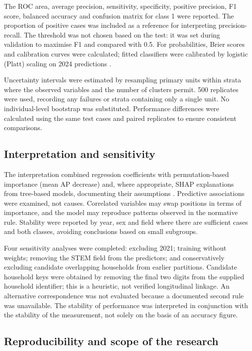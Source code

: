 The ROC area, average precision, sensitivity, specificity, positive precision, F1 score, balanced accuracy and confusion matrix for class 1 were reported. The proportion of positive cases was included as a reference for interpreting precision-recall. The threshold was not chosen based on the test: it was set during validation to maximise F1 and compared with 0.5. For probabilities, Brier scores and calibration curves were calculated; fitted classifiers were calibrated by logistic (Platt) scaling on 2024 predictions \cite{SilvaFilho2023}.

Uncertainty intervals were estimated by resampling primary units within strata where the observed variables and the number of clusters permit. 500 replicates were used, recording any failures or strata containing only a single unit. No individual-level bootstrap was substituted. Performance differences were calculated using the same test cases and paired replicates to ensure consistent comparisons.

\subsection{Interpretation and sensitivity}




The interpretation combined regression coefficients with permutation-based importance (mean AP decrease) and, where appropriate, SHAP explanations from tree-based models, documenting their assumptions \cite{Molnar2025}. Predictive associations were examined, not causes. Correlated variables may swap positions in terms of importance, and the model may reproduce patterns observed in the normative rule. Stability were reported by year, sex and field where there are sufficient cases and both classes, avoiding conclusions based on small subgroups.

Four sensitivity analyses were completed: excluding 2021; training without weights; removing the STEM field from the predictors; and conservatively excluding candidate overlapping households from earlier partitions. Candidate household keys were obtained by removing the final two digits from the supplied household identifier; this is a heuristic, not verified longitudinal linkage. An alternative correspondence was not evaluated because a documented second rule was unavailable. The stability of performance was interpreted in conjunction with the stability of the measurement, not solely on the basis of an accuracy figure.

\subsection{Reproducibility and scope of the research}



